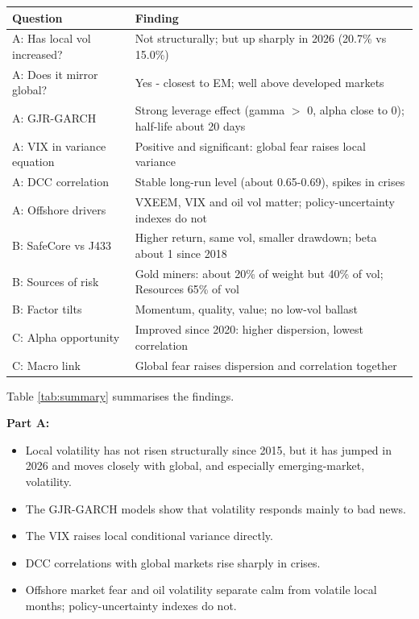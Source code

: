 \documentclass[11pt,preprint]{elsarticle}
\let\origtable\table
\let\endorigtable\endtable
\renewenvironment{table}[1][2] {
    \expandafter\origtable\expandafter[H]
} {
    \endorigtable
}
\numberwithin{equation}{section}
\numberwithin{figure}{section}
\numberwithin{table}{section}
\def\tightlist{} %
\begin{document}
\begin{table}[!htbp]
\centering
\caption{Summary of findings} 
\label{tab:summary}
\begingroup\scriptsize
\begin{tabular}{p{4.2cm}p{10cm}}
  \hline
Question & Finding \\ 
  \hline
A: Has local vol increased? & Not structurally; but up sharply in 2026 (20.7\% vs 15.0\%) \\ 
  A: Does it mirror global? & Yes - closest to EM; well above developed markets \\ 
  A: GJR-GARCH & Strong leverage effect (gamma $>$ 0, alpha close to 0); half-life about 20 days \\ 
  A: VIX in variance equation & Positive and significant: global fear raises local variance \\ 
  A: DCC correlation & Stable long-run level (about 0.65-0.69), spikes in crises \\ 
  A: Offshore drivers & VXEEM, VIX and oil vol matter; policy-uncertainty indexes do not \\ 
  B: SafeCore vs J433 & Higher return, same vol, smaller drawdown; beta about 1 since 2018 \\ 
  B: Sources of risk & Gold miners: about 20\% of weight but 40\% of vol; Resources 65\% of vol \\ 
  B: Factor tilts & Momentum, quality, value; no low-vol ballast \\ 
  C: Alpha opportunity & Improved since 2020: higher dispersion, lowest correlation \\ 
  C: Macro link & Global fear raises dispersion and correlation together \\ 
   \hline
\end{tabular}
\endgroup
\end{table}

Table \ref{tab:summary} summarises the findings.

\textbf{Part A:}

\begin{itemize}
\tightlist
\item
  Local volatility has not risen structurally since 2015, but it has
  jumped in 2026 and moves closely with global, and especially
  emerging-market, volatility.
\item
  The GJR-GARCH models show that volatility responds mainly to bad news.
\item
  The VIX raises local conditional variance directly.
\item
  DCC correlations with global markets rise sharply in crises.
\item
  Offshore market fear and oil volatility separate calm from volatile
  local months; policy-uncertainty indexes do not.
\end{itemize}
\end{document}
